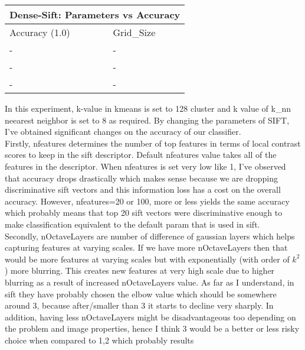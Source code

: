 \documentclass[12pt]{article}
\begin{document}
    \vspace*{0.5cm}
        \begin{tabular}{ |p{1.5cm}||p{3cm}|  }
            \hline
            \multicolumn{2}{|c|}{Dense-Sift: Parameters vs Accuracy} \\
            \hline
            Accuracy (1.0) & Grid\_Size \\
            \hline
            - & - \\
            \hline
            - & - \\
            \hline
            - & - \\
            \hline
        \end{tabular}

    \begin{center}
        \raggedright
        In this experiment, k-value in kmeans is set to 128 cluster and k value of k\_nn neearest neighbor is set to 8 as required.
        By changing the parameters of SIFT, I've obtained significant changes on the accuracy of our classifier.
        \\
        Firstly, nfeatures determines the number of top features in terms of local contrast scores to keep in the sift descriptor. 
        Default nfeatures value takes all of the features in the descriptor. When nfeatures is set very low like 1, I've observed that accuracy drops drastically
        which makes sense because we are dropping discriminative sift vectors and this information loss has a cost on the overall accuracy.
        However, nfeatures=20 or 100, more or less yields the same accuracy which probably means that top 20 sift vectors were discriminative enough to make 
        classification equivalent to the default param that is used in sift.
        \\
        Secondly, nOctaveLayers are number of difference of gaussian layers which helps capturing features at varying scales.
        If we have more nOctaveLayers then that would be more features at varying scales but with exponentially (with order of $k^{2}$) more blurring.
        This creates new features at very high scale due to higher blurring as a result of increased nOctaveLayers value.
        As far as I understand, in sift they have probably chosen the elbow value which should be somewhere around 3, because after/smaller than 3 it starts to decline very sharply.
        In addition, having less nOctaveLayers might be disadvantageous too depending on the problem and image properties, hence I think 3 would be a better or less risky choice when compared to 1,2 which probably results

\end{center}
\end{document}
